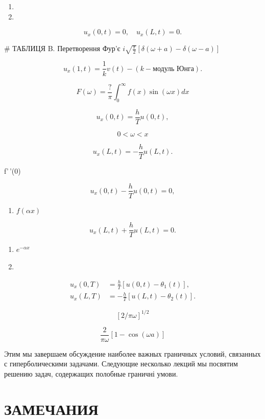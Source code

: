 \documentclass[
  ukrainian,
]{article}
\providecommand{\tightlist}{%
  \setlength{\itemsep}{0pt}\setlength{\parskip}{0pt}}
\begin{document}
\begin{enumerate}
\def\labelenumi{\arabic{enumi}.}
\setcounter{enumi}{18}
\tightlist
\item
\item
\end{enumerate}

\[
u_x(0, t) = 0, \quad u_x(L, t) = 0.
\]

\# ТАБЛИЦЯ B. Перетворення Фур'є
\(i \sqrt{\frac{\pi}{2}} [\delta(\omega+a) - \delta(\omega-a)]\)

\[
u_{x}(1, t) = \frac{1}{k} v(t) - (k - \text{модуль Юнга}).
\]

\[
F(\omega) = \frac{?}{\pi} \int_{0}^{\infty} f(x) \sin(\omega x) dx
\]

\[
u_{x}(0, t) = \frac{h}{T} u(0, t),
\]

\[
0 < \omega < x
\]

\[
u_{x}(L, t) = -\frac{h}{T} u(L, t).
\]

f'\,'(0)

\[
u_{x}(0, t) - \frac{h}{T}u(0, t) = 0,
\]

\begin{enumerate}
\def\labelenumi{\arabic{enumi}.}
\setcounter{enumi}{1}
\tightlist
\item
  \(f(\alpha x)\)
\end{enumerate}

\[
u_{x}(L, t) + \frac{h}{T}u(L, t) = 0.
\]

\begin{enumerate}
\def\labelenumi{\arabic{enumi}.}
\setcounter{enumi}{2}
\item
  \(e^{-\alpha x}\)
\item
\end{enumerate}

\[
\begin{aligned} u_x(0, T) &= \frac{h}{T} [u(0, t) - \theta_1(t)], \\ u_x(L, T) &= -\frac{h}{T} [u(L, t) - \theta_2(t)]. \end{aligned}
\]

\[
[2/\pi\omega]^{1/2}
\]

\[
\frac{2}{\pi\omega} [1-\cos(\omega a)]
\]

Этим мы завершаем обсуждение наиболее важных граничных условий,
связанных с гиперболическими задачами. Следующие несколько лекций мы
посвятим решению задач, содержащих полобные граничні умови.

\section{ЗАМЕЧАНИЯ}\label{ux437ux430ux43cux435ux447ux430ux43dux438ux44f-4}
\end{document}
